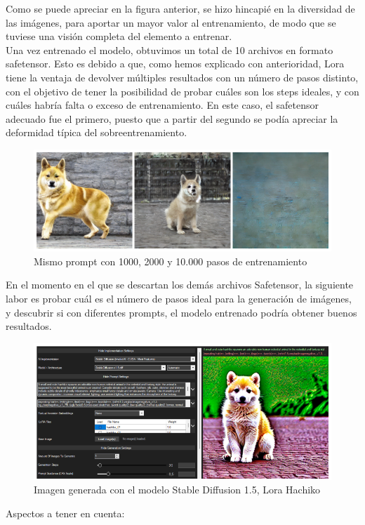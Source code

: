 Como se puede apreciar en la figura anterior, se hizo hincapié en la diversidad de las imágenes, para aportar un mayor valor al entrenamiento, de modo que se tuviese una visión completa del elemento a entrenar.\\ 
Una vez entrenado el modelo, obtuvimos un total de 10 archivos en formato safetensor. Esto es debido a que, como hemos explicado con anterioridad, Lora tiene la ventaja de devolver múltiples resultados con un número de pasos distinto, con el objetivo de tener la posibilidad de probar cuáles son los steps ideales, y con cuáles habría falta o exceso de entrenamiento. En este caso, el safetensor adecuado fue el primero, puesto que a partir del segundo se podía apreciar la deformidad típica del sobreentrenamiento.\\
\begin{figure}[h]
	\centering
	\includegraphics[width = 0.6
	\textwidth]{Imagenes/Vectorial/comparacion_hachiko.png}
	\caption{Mismo prompt con 1000, 2000 y 10.000 pasos de entrenamiento}
	\label{fig:sampleImage}
\end{figure}

En el momento en el que se descartan los demás archivos Safetensor, la siguiente labor es probar cuál es el número de pasos ideal para la generación de imágenes, y descubrir si con diferentes prompts, el modelo entrenado podría obtener buenos resultados.\\

\begin{figure}[h]
	\centering
	\includegraphics[width = 0.6
	\textwidth]{Imagenes/Vectorial/hachiko_detallada.png}
	\caption{Imagen generada con el modelo Stable Diffusion 1.5, Lora Hachiko}
	\label{fig:sampleImage}
\end{figure}

Aspectos a tener en cuenta:\\


